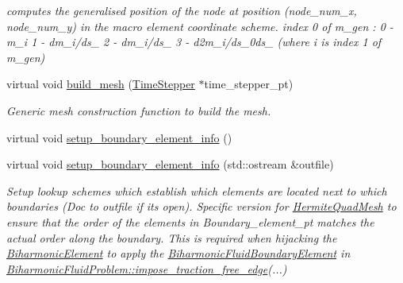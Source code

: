 \begin{DoxyCompactItemize}
\begin{DoxyCompactList}\small\item\em computes the generalised position of the node at position (node\+\_\+num\+\_\+x, node\+\_\+num\+\_\+y) in the macro element coordinate scheme. index 0 of m\+\_\+gen \+: 0 -\/ m\+\_\+i 1 -\/ dm\+\_\+i/ds\+\_ 2 -\/ dm\+\_\+i/ds\+\_ 3 -\/ d2m\+\_\+i/ds\+\_\+0ds\+\_ (where i is index 1 of m\+\_\+gen) \end{DoxyCompactList}\item 
virtual void \hyperlink{classoomph_1_1HermiteQuadMesh_af72fd9b700fdee643ce6d6259c0e8e6f}{build\+\_\+mesh} (\hyperlink{classoomph_1_1TimeStepper}{Time\+Stepper} $\ast$time\+\_\+stepper\+\_\+pt)
\begin{DoxyCompactList}\small\item\em Generic mesh construction function to build the mesh. \end{DoxyCompactList}\item 
virtual void \hyperlink{classoomph_1_1HermiteQuadMesh_a6eefe872b5bf8a06174b536d9727ea44}{setup\+\_\+boundary\+\_\+element\+\_\+info} ()
\item 
virtual void \hyperlink{classoomph_1_1HermiteQuadMesh_a0e4cd3df0828e87a762c61b09121e1c0}{setup\+\_\+boundary\+\_\+element\+\_\+info} (std\+::ostream \&outfile)
\begin{DoxyCompactList}\small\item\em Setup lookup schemes which establish which elements are located next to which boundaries (Doc to outfile if it\textquotesingle{}s open). Specific version for \hyperlink{classoomph_1_1HermiteQuadMesh}{Hermite\+Quad\+Mesh} to ensure that the order of the elements in Boundary\+\_\+element\+\_\+pt matches the actual order along the boundary. This is required when hijacking the \hyperlink{classoomph_1_1BiharmonicElement}{Biharmonic\+Element} to apply the \hyperlink{classoomph_1_1BiharmonicFluidBoundaryElement}{Biharmonic\+Fluid\+Boundary\+Element} in \hyperlink{classoomph_1_1BiharmonicFluidProblem_a1cc57555bbd0ceef1d93010c133ac597}{Biharmonic\+Fluid\+Problem\+::impose\+\_\+traction\+\_\+free\+\_\+edge}(...) \end{DoxyCompactList}\end{DoxyCompactItemize}
